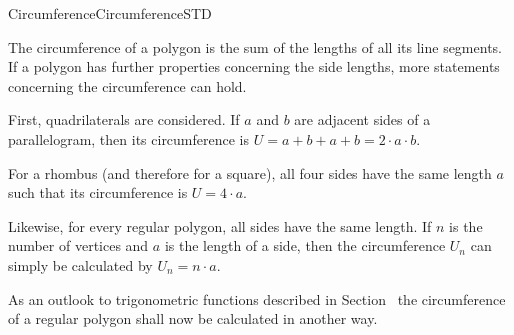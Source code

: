 \begin{MXContent}{Circumference}{Circumference}{STD}

The circumference of a polygon is the sum of the lengths of all its
line segments. If a polygon has further properties concerning the side lengths, 
more statements concerning the circumference can hold.

First, quadrilaterals are considered. If $a$ and $b$ are adjacent sides 
of a parallelogram, then its circumference is 
$U = a + b + a + b = 2 \cdot a \cdot b$.

For a rhombus (and therefore for a square), all four sides have the same length $a$ such
that its circumference is $U = 4 \cdot a$.

Likewise, for every regular polygon, all sides have the same length. If $n$ is the number 
of vertices and $a$ is the length of a side, then the circumference $U_n$ can simply be
calculated by $U_n = n \cdot a$.

As an outlook to trigonometric functions described in Section~ 
the circumference of a regular polygon shall now be calculated in another way. 


\begin{center}
\end{center}


\end{MXContent}
